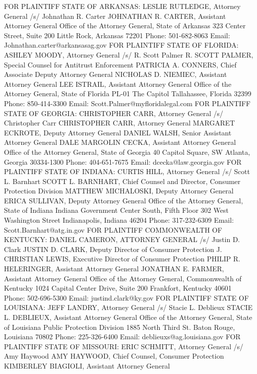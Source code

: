 \documentclass[11pt,b5paper]{scrartcl}
\begin{document}
FOR PLAINTIFF STATE OF ARKANSAS:
LESLIE RUTLEDGE, Attorney General
/s/ Johnathan R. Carter
JOHNATHAN R. CARTER, Assistant Attorney General
Office of the Attorney General, State of Arkansas
323 Center Street, Suite 200
Little Rock, Arkansas 72201
Phone: 501-682-8063
Email: Johnathan.carter@arkansasag.gov
FOR PLAINTIFF STATE OF FLORIDA:
ASHLEY MOODY, Attorney General
/s/ R. Scott Palmer
R. SCOTT PALMER, Special Counsel for Antitrust Enforcement
PATRICIA A. CONNERS, Chief Associate Deputy Attorney General
NICHOLAS D. NIEMIEC, Assistant Attorney General
LEE ISTRAIL, Assistant Attorney General
Office of the Attorney General, State of Florida
PL-01 The Capitol
Tallahassee, Florida 32399
Phone: 850-414-3300
Email: Scott.Palmer@myfloridalegal.com
FOR PLAINTIFF STATE OF GEORGIA:
CHRISTOPHER CARR, Attorney General
/s/ Christopher Carr
CHRISTOPHER CARR, Attorney General
MARGARET ECKROTE, Deputy Attorney General
DANIEL WALSH, Senior Assistant Attorney General
DALE MARGOLIN CECKA, Assistant Attorney General
Office of the Attorney General, State of Georgia
40 Capitol Square, SW
Atlanta, Georgia 30334-1300
Phone: 404-651-7675
Email: dcecka@law.georgia.gov
FOR PLAINTIFF STATE OF INDIANA:
CURTIS HILL, Attorney General
/s/ Scott L. Barnhart
SCOTT L. BARNHART, Chief Counsel and Director, Consumer Protection Division
MATTHEW MICHALOSKI, Deputy Attorney General
ERICA SULLIVAN, Deputy Attorney General
Office of the Attorney General, State of Indiana
Indiana Government Center South, Fifth Floor
302 West Washington Street
Indianapolis, Indiana 46204
Phone: 317-232-6309
Email: Scott.Barnhart@atg.in.gov
FOR PLAINTIFF COMMONWEALTH OF KENTUCKY:
DANIEL CAMERON, ATTORNEY GENERAL
/s/ Justin D. Clark
JUSTIN D. CLARK, Deputy Director of Consumer Protection
J. CHRISTIAN LEWIS, Executive Director of Consumer Protection
PHILIP R. HELERINGER, Assistant Attorney General
JONATHAN E. FARMER, Assistant Attorney General
Office of the Attorney General, Commonwealth of Kentucky
1024 Capital Center Drive, Suite 200
Frankfort, Kentucky 40601
Phone: 502-696-5300
Email: justind.clark@ky.gov
FOR PLAINTIFF STATE OF LOUISIANA:
JEFF LANDRY, Attorney General
/s/ Stacie L. Deblieux
STACIE L. DEBLIEUX, Assistant Attorney General
Office of the Attorney General, State of Louisiana
Public Protection Division
1885 North Third St.
Baton Rouge, Louisiana 70802
Phone: 225-326-6400
Email: deblieuxs@ag.louisiana.gov
FOR PLAINTIFF STATE OF MISSOURI:
ERIC SCHMITT, Attorney General
/s/ Amy Haywood
AMY HAYWOOD, Chief Counsel, Consumer Protection
KIMBERLEY BIAGIOLI, Assistant Attorney General
\end{document}
